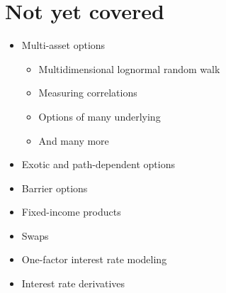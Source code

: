 \section{Not yet covered}
\begin{itemize}
    \setlength\itemsep{0em}
    \item Multi-asset options
    \begin{itemize}
		\setlength\itemsep{0em}
		\item Multidimensional lognormal random walk
		\item Measuring correlations
		\item Options of many underlying
		\item And many more
	\end{itemize}
    \item Exotic and path-dependent options
    \item Barrier options
    \item Fixed-income products
    \item Swaps
    \item One-factor interest rate modeling
    \item Interest rate derivatives
\end{itemize}
